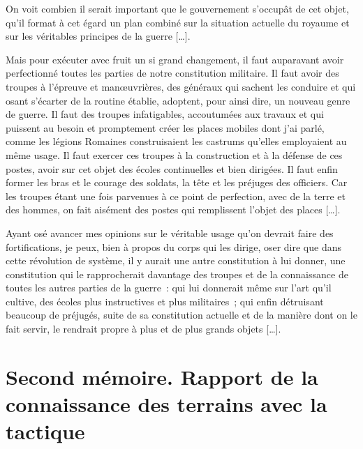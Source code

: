 \documentclass[french,twoside]{book} %
\begin{document}
On voit combien il serait important que le gouvernement s’occupât de cet objet, qu’il format à cet égard un plan combiné sur la situation actuelle du royaume et sur les véritables principes de la guerre […].\par
Mais pour exécuter avec fruit un si grand changement, il faut auparavant avoir perfectionné toutes les parties de notre constitution militaire. Il faut avoir des troupes à l’épreuve et manœuvrières, des généraux qui sachent les conduire et qui osant s’écarter de la routine établie, adoptent, pour ainsi dire, un nouveau genre de guerre. Il faut des troupes infatigables, accoutumées aux travaux et qui puissent au besoin et promptement créer les places mobiles dont j’ai parlé, comme les légions Romaines construisaient les castrums qu’elles employaient au même usage. Il faut exercer ces troupes à la construction et à la défense de ces postes, avoir sur cet objet des écoles continuelles et bien dirigées. Il faut enfin former les bras et le courage des soldats, la tête et les préjuges des officiers. Car les troupes étant une fois parvenues à ce point de perfection, avec de la terre et des hommes, on fait aisément des postes qui remplissent l’objet des places […].\par
Ayant osé avancer mes opinions sur le véritable usage qu’on devrait faire des fortifications, je peux, bien à propos du corps qui les dirige, oser dire que dans cette révolution de système, il y aurait une autre constitution à lui donner, une constitution qui le rapprocherait davantage des troupes et de la connaissance de toutes les autres parties de la guerre : qui lui donnerait même sur l’art qu’il cultive, des écoles plus instructives et plus militaires ; qui enfin détruisant beaucoup de préjugés, suite de sa constitution actuelle et de la manière dont on le fait servir, le rendrait propre à plus et de plus grands objets […].
\section[{Second mémoire. Rapport de la connaissance des terrains avec la tactique}]{Second mémoire. Rapport de la connaissance des terrains avec la tactique}\renewcommand{\leftmark}{Second mémoire. Rapport de la connaissance des terrains avec la tactique}
\end{document}
